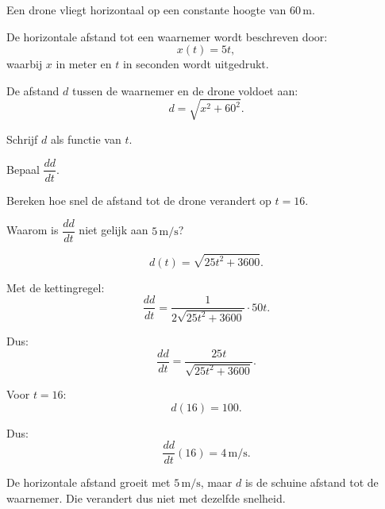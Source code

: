 \documentclass{ximera}
\begin{document}
\begin{oefening}{\oefG}

Een drone vliegt horizontaal op een constante hoogte van
$60\,\mathrm{m}$.

De horizontale afstand tot een waarnemer wordt beschreven door:
\[
x(t)=5t,
\]
waarbij $x$ in meter en $t$ in seconden wordt uitgedrukt.

De afstand $d$ tussen de waarnemer en de drone voldoet aan:
\[
d=\sqrt{x^2+60^2}.
\]

\begin{question}
Schrijf $d$ als functie van $t$.
\end{question}

\begin{question}
Bepaal $\dfrac{dd}{dt}$.
\end{question}

\begin{question}
Bereken hoe snel de afstand tot de drone verandert op $t=16$.
\end{question}

\begin{question}
Waarom is $\dfrac{dd}{dt}$ niet gelijk aan $5\,\mathrm{m/s}$?
\end{question}

\begin{oplossing}

\[
d(t)=\sqrt{25t^2+3600}.
\]

Met de kettingregel:
\[
\frac{dd}{dt}
=
\frac{1}{2\sqrt{25t^2+3600}}\cdot50t.
\]

Dus:
\[
\boxed{\frac{dd}{dt}=\frac{25t}{\sqrt{25t^2+3600}}.}
\]

Voor $t=16$:
\[
d(16)=100.
\]

Dus:
\[
\boxed{\frac{dd}{dt}(16)=4\,\mathrm{m/s}.}
\]

De horizontale afstand groeit met $5\,\mathrm{m/s}$, maar $d$ is de schuine
afstand tot de waarnemer. Die verandert dus niet met dezelfde snelheid.

\end{oplossing}

\end{oefening}
\end{document}
